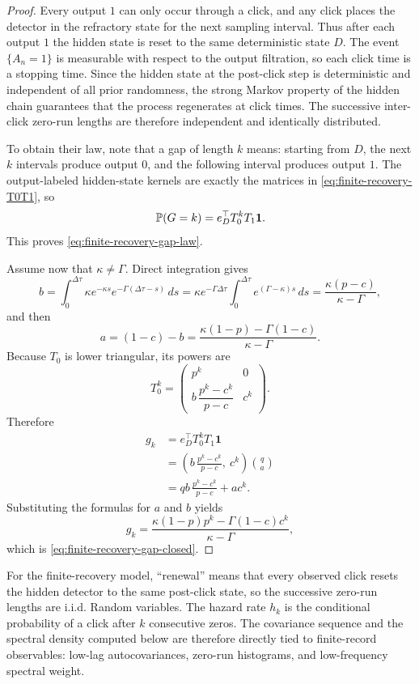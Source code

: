 \begin{proof}
Every output $1$ can only occur through a click, and any click places the detector in the refractory state for the next sampling interval. Thus after each output $1$ the hidden state is reset to the same deterministic state $D$. The event $\{A_n=1\}$ is measurable with respect to the output filtration, so each click time is a stopping time. Since the hidden state at the post-click step is deterministic and independent of all prior randomness, the strong Markov property of the hidden chain guarantees that the process regenerates at click times. The successive inter-click zero-run lengths are therefore independent and identically distributed.

To obtain their law, note that a gap of length $k$ means: starting from $D$, the next $k$ intervals produce output $0$, and the following interval produces output $1$. The output-labeled hidden-state kernels are exactly the matrices in \eqref{eq:finite-recovery-T0T1}, so
\[
\mathbb{P}(G=k)=e_D^\top T_0^kT_1\mathbf 1.
\]
This proves \eqref{eq:finite-recovery-gap-law}.

Assume now that $\kappa\neq\Gamma$. Direct integration gives
\[
b
=
\int_0^{\Delta\tau}\kappa e^{-\kappa s}e^{-\Gamma(\Delta\tau-s)}\,ds
=
\kappa e^{-\Gamma\Delta\tau}\int_0^{\Delta\tau}e^{(\Gamma-\kappa)s}\,ds
=
\frac{\kappa(p-c)}{\kappa-\Gamma},
\]
and then
\[
a=(1-c)-b
=
\frac{\kappa(1-p)-\Gamma(1-c)}{\kappa-\Gamma}.
\]
Because $T_0$ is lower triangular, its powers are
\[
T_0^k=
\begin{pmatrix}
p^k&0\\[1mm]
b\,\dfrac{p^k-c^k}{p-c}&c^k
\end{pmatrix}.
\]
Therefore
\begin{align*}
g_k
&=
e_D^\top T_0^kT_1\mathbf 1\\
&=
\left(
b\,\frac{p^k-c^k}{p-c},
\ c^k
\right)
\binom{q}{a}\\
&=
qb\,\frac{p^k-c^k}{p-c}+ac^k.
\end{align*}
Substituting the formulas for $a$ and $b$ yields
\[
g_k
=
\frac{\kappa(1-p)p^k-\Gamma(1-c)c^k}{\kappa-\Gamma},
\]
which is \eqref{eq:finite-recovery-gap-closed}.
\end{proof}

\begin{remark}\label{rem:renewal-primer}
For the finite-recovery model, ``renewal'' means that every observed click resets the hidden detector to the same post-click state, so the successive zero-run lengths are i.i.d. Random variables. The hazard rate $h_k$ is the conditional probability of a click after $k$ consecutive zeros. The covariance sequence and the spectral density computed below are therefore directly tied to finite-record observables: low-lag autocovariances, zero-run histograms, and low-frequency spectral weight.
\end{remark}


